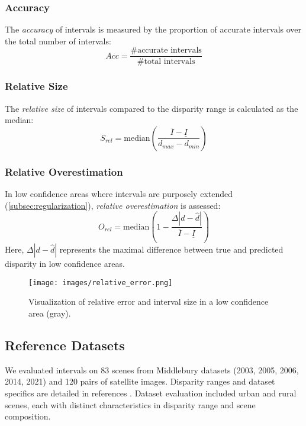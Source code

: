 \subsubsection{Accuracy}
The \textit{accuracy} of intervals is measured by the proportion of accurate intervals over the total number of intervals:
\begin{equation}
    Acc = \frac{\# \text{accurate intervals}}{\# \text{total intervals}}\label{eq:accuracy}
\end{equation}

\subsubsection{Relative Size}
The \textit{relative size} of intervals compared to the disparity range is calculated as the median:
\begin{equation}
    S_{rel} = \text{median}\left(\frac{\overline{I} - \underline{I}}{d_{max} - d_{min}}\right)\label{eq:size_of_interval}
\end{equation}

\subsubsection{Relative Overestimation}
In low confidence areas where intervals are purposely extended (\cref{subsec:regularization}), \textit{relative overestimation} is assessed:
\begin{equation}
    O_{rel} = \text{median}\left(1 - \frac{\Delta|d - \hat{d}|}{\overline{I} - \underline{I}}\right)\label{eq:relative_error}
\end{equation}
Here, $\Delta|d - \hat{d}|$ represents the maximal difference between true and predicted disparity in low confidence areas.

\begin{figure}[ht]
    \centering
    \texttt{[image: images/relative\_error.png]}
    \caption{Visualization of relative error and interval size in a low confidence area (gray).}
    \label{fig:relative_error}
\end{figure}

\subsection{Reference Datasets}
We evaluated intervals on 83 scenes from Middlebury datasets (2003, 2005, 2006, 2014, 2021) and 120 pairs of satellite images. Disparity ranges and dataset specifics are detailed in references \cite{scharstein_taxonomy_2001, scharstein_high-accuracy_2003, scharstein_learning_2007, jiang_high-resolution_2014, cournet_ground_2020}. Dataset evaluation included urban and rural scenes, each with distinct characteristics in disparity range and scene composition.

